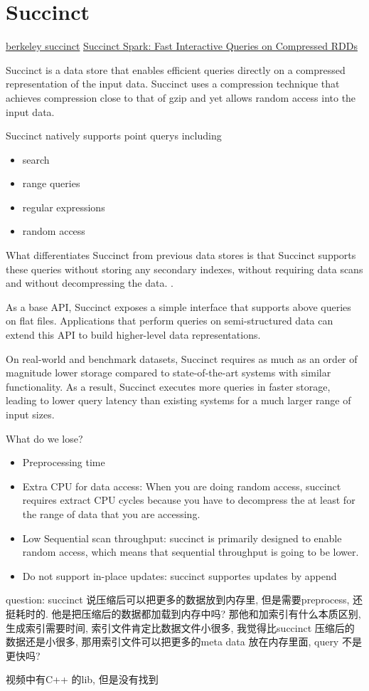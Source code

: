 \section{Succinct}
\href{http://succinct.cs.berkeley.edu/}{berkeley succinct}
\href{https://www.youtube.com/watch?v=O1a6YxFMp0g}{Succinct Spark: Fast Interactive Queries on Compressed RDDs}

Succinct is a data store that enables efficient queries directly on a compressed representation of the input data.
Succinct uses a compression technique that achieves compression close to that of gzip and yet allows random access into the input data.

Succinct natively supports point querys including
\begin{itemize}
\item search
\item range queries
\item regular expressions
\item random access
\end{itemize}

What differentiates Succinct from previous data stores is that Succinct supports these queries without storing any secondary indexes, without requiring data scans and without decompressing the data.
.

As a base API, Succinct exposes a simple interface that supports above queries on flat files.
Applications that perform queries on semi-structured data can extend this API to build higher-level data representations.

On real-world and benchmark datasets, Succinct requires as much as an order of magnitude lower storage compared to state-of-the-art systems with similar functionality.
As a result, Succinct executes more queries in faster storage, leading to lower query latency than existing systems for a much larger range of input sizes.

What do we lose?
\begin{itemize}
\item Preprocessing time
\item Extra CPU for data access: When you are doing random access, succinct requires extract CPU cycles because you have to decompress the at least for the range of data that you are accessing.
\item Low Sequential scan throughput: succinct is primarily designed to enable random access, which means that sequential throughput is going to be lower.
\item Do not support in-place updates: succinct supportes updates by append
\end{itemize}

question:
succinct 说压缩后可以把更多的数据放到内存里, 但是需要preprocess, 还挺耗时的.
他是把压缩后的数据都加载到内存中吗?
那他和加索引有什么本质区别, 生成索引需要时间, 索引文件肯定比数据文件小很多, 我觉得比succinct 压缩后的数据还是小很多, 那用索引文件可以把更多的meta data 放在内存里面, query 不是更快吗?

视频中有C++ 的lib, 但是没有找到


